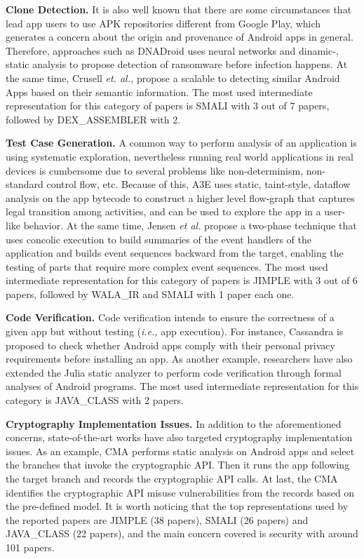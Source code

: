 \textbf{Clone Detection.} It is also well known that there are some circumstances that lead app users to use APK repositories different from Google Play, which generates a concern about the origin and provenance of Android apps in general. Therefore, approaches such as DNADroid\cite{crussell:ESORICS2012} uses neural networks and dinamic-, static analysis to propose detection of ransomware before infection happens. At the same time, Crusell \textit{et. al.,} \cite{crussell:ESORICS2013} propose a scalable to detecting similar Android Apps based on their semantic information. The most used intermediate representation for this category of papers is SMALI with 3 out of 7 papers, followed by DEX\_ASSEMBLER with 2.

\textbf{Test Case Generation.} A common way to perform analysis of an application is using systematic exploration, nevertheless running real world applications in real devices is cumbersome due to several problems like non-determinism, non-standard control flow, etc. Because of this, A3E\cite{azim:OOPSLA2013} uses static, taint-style, dataflow analysis on the app bytecode to construct a higher level flow-graph that captures legal transition among activities, and can be used to explore the app in a user-like behavior. At the same time, Jensen \textit{et al.}\cite{jensen:ISSTA2013} propose a two-phase technique that uses concolic execution to build summaries of the event handlers of the application and builds event sequences backward from the target, enabling the testing of parts that require more complex event sequences. The most used intermediate representation for this category of papers is JIMPLE with 3 out of 6 papers, followed by WALA\_IR and SMALI with 1 paper each one.

\textbf{Code Verification.} 
Code verification intends to ensure the correctness of a given app but without testing (\textit{i.e.,} app execution). For instance, Cassandra \cite{lortz:SPSMD2014} is proposed to check whether Android apps comply with their personal privacy requirements before installing an app. As another example, researchers have also extended the Julia \cite{payet:IST2012} static analyzer to perform code verification through formal analyses of Android programs. The most used intermediate representation for this category is JAVA\_CLASS with 2 papers.

\textbf{Cryptography Implementation Issues.} In addition to the aforementioned concerns, state-of-the-art works have also targeted cryptography implementation issues. As an example, CMA \cite{shuai2014modelling} performs static analysis on Android apps and select the branches that invoke the cryptographic API. Then it runs the app following the target branch and records the cryptographic API calls. At last, the CMA identifies the cryptographic API misuse vulnerabilities from the records based on the pre-defined model.
It is worth noticing that the top representations used by the reported papers are JIMPLE (38 papers), SMALI (26 papers) and JAVA\_CLASS (22 papers), and the main concern covered is security with around 101 papers.


